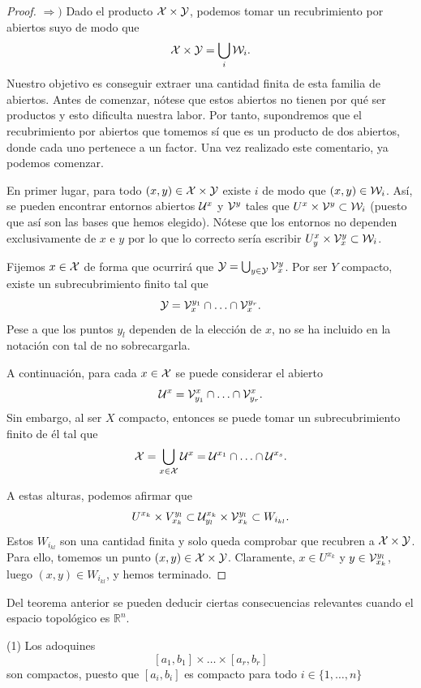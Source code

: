 \begin{itemize}
\begin{theo}
\begin{proof}
$\Rightarrow )$ Dado el producto $\mathcal{X}\times \mathcal{Y}$, podemos tomar un recubrimiento por abiertos suyo de modo que 
\[\mathcal{X}\times \mathcal{Y}=\bigcup_{i}\mathcal{W}_i.\]
Nuestro objetivo es conseguir extraer una cantidad finita de esta familia de abiertos. Antes de comenzar, nótese que estos abiertos no tienen por qué ser productos y esto dificulta nuestra labor. Por tanto, supondremos que el recubrimiento por abiertos que tomemos sí que es un producto de dos abiertos, donde cada uno pertenece a un factor. Una vez realizado este comentario, ya podemos comenzar. 

En primer lugar, para todo $(x,y)\in\mathcal{X}\times \mathcal{Y}$ existe $i$ de modo que $(x,y)\in \mathcal{W}_i$. Así, se pueden encontrar entornos abiertos $\mathcal{U}^x$ y $\mathcal{V}^y$ tales que $U^x\times \mathcal{V}^y \subset \mathcal{W}_i$ (puesto que así son las bases que hemos elegido). Nótese que los entornos no dependen exclusivamente de $x$ e $y$ por lo que lo correcto sería escribir $U^x_y\times \mathcal{V}^y_x \subset \mathcal{W}_i$. 

Fijemos $x\in \mathcal{X}$ de forma que ocurrirá que $\mathcal{Y}=\bigcup_{y\in \mathcal{Y}} \mathcal{V}_x^y$. Por ser $Y$ compacto, existe un subrecubrimiento finito tal que 
\[\mathcal{Y}=\mathcal{V}_x^{y_1}\cap \ldots \cap \mathcal{V}_x^{y_r}.\]
Pese a que los puntos $y_l$ dependen de la elección de $x$, no se ha incluido en la notación con tal de no sobrecargarla. 

A continuación, para cada $x\in \mathcal{X}$ se puede considerar el abierto
\[\mathcal{U}^x=\mathcal{V}^x_{y_1}\cap \ldots \cap \mathcal{V}^x_{y_r}.\]
Sin embargo, al ser $X$ compacto, entonces se puede tomar un subrecubrimiento finito de él tal que
\[\mathcal{X}=\bigcup_{x\in \mathcal{X}}\mathcal{U}^x=\mathcal{U}^{x_1}\cap \ldots \cap \mathcal{U}^{x_s}.\]

A estas alturas, podemos afirmar que
\[U^{x_k}\times V_{x_k}^{y_l}\subset \mathcal{U}_{y_l}^{x_k}\times \mathcal{V}_{x_k}^{y_l}\subset W_{i_{kl}}.\]
Estos $W_{i_{kl}}$ son una cantidad finita y solo queda comprobar que recubren a $\mathcal{X}\times \mathcal{Y}$. Para ello, tomemos un punto $(x,y)\in \mathcal{X}\times \mathcal{Y}$. Claramente, $x\in U^{x_k}$ y $y\in  \mathcal{V}_{x_k}^{y_l}$, luego $(x,y)\in W_{i_{kl}}$, y hemos terminado. 
\end{proof}
\end{theo}

Del teorema anterior se pueden deducir ciertas consecuencias relevantes cuando el espacio topológico es $\mathbb{R}^n$.

\begin{obs}

(1) Los adoquines 
\[[a_1,b_1]\times \ldots \times [a_r,b_r]\]
son compactos, puesto que $[a_i,b_i]$ es compacto para todo $i\in \{1,\ldots, n\}$


\end{obs}
\end{itemize}
